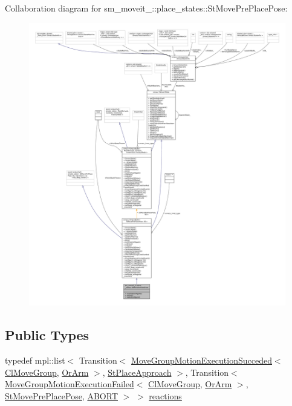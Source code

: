 Collaboration diagram for sm\+\_\+moveit\+\_\+:\+:place\+\_\+states\+:\+:St\+Move\+Pre\+Place\+Pose\+:
\nopagebreak
\begin{figure}[H]
\begin{center}
\leavevmode
\includegraphics[width=350pt]{structsm__moveit__4_1_1place__states_1_1StMovePrePlacePose__coll__graph}
\end{center}
\end{figure}
\subsection*{Public Types}
\begin{DoxyCompactItemize}
\item 
typedef mpl\+::list$<$ Transition$<$ \hyperlink{structmoveit__z__client_1_1MoveGroupMotionExecutionSucceded}{Move\+Group\+Motion\+Execution\+Succeded}$<$ \hyperlink{classmoveit__z__client_1_1ClMoveGroup}{Cl\+Move\+Group}, \hyperlink{classsm__moveit__4_1_1OrArm}{Or\+Arm} $>$, \hyperlink{structsm__moveit__4_1_1place__states_1_1StPlaceApproach}{St\+Place\+Approach} $>$, Transition$<$ \hyperlink{structmoveit__z__client_1_1MoveGroupMotionExecutionFailed}{Move\+Group\+Motion\+Execution\+Failed}$<$ \hyperlink{classmoveit__z__client_1_1ClMoveGroup}{Cl\+Move\+Group}, \hyperlink{classsm__moveit__4_1_1OrArm}{Or\+Arm} $>$, \hyperlink{structsm__moveit__4_1_1place__states_1_1StMovePrePlacePose}{St\+Move\+Pre\+Place\+Pose}, \hyperlink{classABORT}{A\+B\+O\+RT} $>$ $>$ \hyperlink{structsm__moveit__4_1_1place__states_1_1StMovePrePlacePose_a24b1fad7c03fc89a7f81699b7bcd63de}{reactions}
\end{DoxyCompactItemize}
